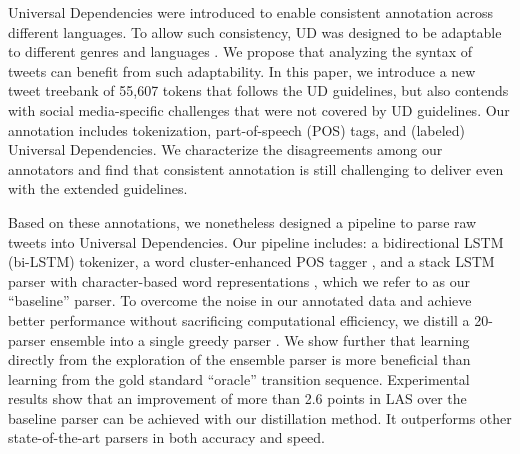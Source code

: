 \documentclass[11pt,a4paper]{article}
\newcommand{\yjcomment}[1]{\textcolor{orange}{[$_\mathrm{L}^\mathrm{Y}$#1]}}
\newcommand{\nascomment}[1]{\textcolor{blue}{[#1 ---\textsc{nas}]}}
\begin{document}

Universal Dependencies \citep[UD]{NIVRE16.348} were introduced to enable
consistent annotation across different languages. To allow such
consistency, UD was designed to be adaptable to different genres \cite{wang-EtAl:2017:Long6} 
and languages \cite{guo-EtAl:2015:ACL-IJCNLP2,TACL892}. We propose that analyzing
the syntax of tweets can benefit from such adaptability. In this paper,
we introduce a new tweet treebank of 55,607 tokens that follows the UD
guidelines, but also contends with social media-specific challenges that were not
covered by UD guidelines. Our annotation includes 
tokenization, part-of-speech (POS) tags, and (labeled) Universal Dependencies.
We characterize the disagreements among our annotators and find that
consistent annotation is still challenging to deliver even with
the extended guidelines.


Based on these annotations, we nonetheless designed a pipeline to parse 
raw tweets into Universal Dependencies. Our pipeline includes: a
bidirectional LSTM (bi-LSTM) tokenizer, a word cluster-enhanced POS
tagger \citep[following][]{owoputi-EtAl:2013:NAACL-HLT}, and a stack LSTM parser
with character-based word representations
\cite{ballesteros-dyer-smith:2015:EMNLP}, which we refer to as our
``baseline'' parser.
To overcome the noise in our annotated data and achieve better performance
without sacrificing computational efficiency, we 
distill a 20-parser ensemble into a single greedy  parser 
\cite{DBLP:journals/corr/HintonVD15}.
We show further  that learning directly from the exploration of the ensemble parser
is more beneficial than learning from the gold standard ``oracle''
transition sequence. Experimental results show that an improvement of more
than 2.6 points in LAS over the
baseline parser can be achieved with our distillation method.  It outperforms
other state-of-the-art parsers in both accuracy and speed.
\end{document}
